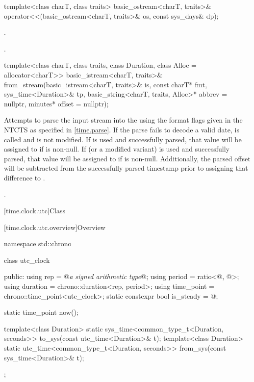 %
\begin{itemdecl}
template<class charT, class traits>
  basic_ostream<charT, traits>&
    operator<<(basic_ostream<charT, traits>& os, const sys_days& dp);
\end{itemdecl}

\begin{itemdescr}
\pnum
\effects
{}.

\pnum
\returns
{}.
\end{itemdescr}

%
\begin{itemdecl}
template<class charT, class traits, class Duration, class Alloc = allocator<charT>>
  basic_istream<charT, traits>&
    from_stream(basic_istream<charT, traits>& is, const charT* fmt,
                sys_time<Duration>& tp, basic_string<charT, traits, Alloc>* abbrev = nullptr,
                minutes* offset = nullptr);
\end{itemdecl}

\begin{itemdescr}
\pnum
\effects
Attempts to parse the input stream 
into the   using
the format flags given in the NTCTS 
as specified in \ref{time.parse}.
If the parse fails to decode a valid date,
 is called and
 is not modified.
If  is used and successfully parsed,
that value will be assigned to  if  is non-null.
If  (or a modified variant) is used and successfully parsed,
that value will be assigned to  if  is non-null.
Additionally, the parsed offset will be subtracted
from the successfully parsed timestamp
prior to assigning that difference to .

\pnum
\returns
{}.
\end{itemdescr}

[time.clock.utc]{Class }

[time.clock.utc.overview]{Overview}
%

\begin{codeblock}
namespace std::chrono {
  class utc_clock {
  public:
    using rep                       = @\textit{a signed arithmetic type}@;
    using period                    = ratio<@\unspecnc@, @\unspec@>;
    using duration                  = chrono::duration<rep, period>;
    using time_point                = chrono::time_point<utc_clock>;
    static constexpr bool is_steady = @\unspec@;

    static time_point now();

    template<class Duration>
      static sys_time<common_type_t<Duration, seconds>>
        to_sys(const utc_time<Duration>& t);
    template<class Duration>
      static utc_time<common_type_t<Duration, seconds>>
        from_sys(const sys_time<Duration>& t);
  };
}
\end{codeblock}

